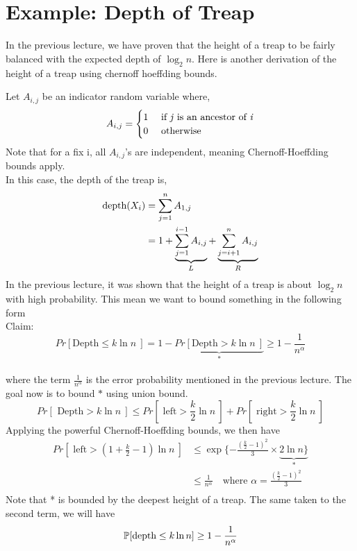 \documentclass[12pt]{article}
\begin{document}
	\MakeScribeTop


\section{Example: Depth of Treap}

 \parindent In the previous lecture, we have proven that the height of a treap to be fairly balanced with the expected depth of $\log_{2}{n}$. Here is another derivation of the height of a treap using chernoff hoeffding bounds. 
 
\setlength{\parindent}{1cm} Let $A_{i,j}$ be an indicator random variable where, $$A_{i,j} = \begin{cases}
                   1 &\text{ if \textit{j} is an ancestor of \textit{i}} \\
                   0 &\text{ otherwise}
               \end{cases}
      $$
Note that for a fix i, all $A_{i,j}$'s are independent, meaning Chernoff-Hoeffding bounds apply.\\
In this case, the depth of the treap is,
\newline \begin{align*}
    \textmd{depth}(X_{i})  &= \sum_{j=1}^{n} A_{1,j}\\
                  &= 1 + \underbrace{\sum_{j=1}^{i-1}A_{i,j}}_{L} +\underbrace{\sum_{j=i+1}^{n}A_{i,j}}_{R}\\
\end{align*}
In the previous lecture, it was shown that the height of a treap is about $\log_{2}{n}$ with high probability. This mean we want to bound something in the following form\\
Claim: $$Pr[\text{Depth} \leq  k\ln{n} \ ] = 1-\underbrace{Pr[ \text{Depth} >  k\ln{n} \ ]}_{*}\geq 1- \frac{1}{n^{\alpha}}$$\\
where the term  $\frac{1}{n^{\alpha}}$ is the error probability mentioned in the previous lecture. 
The goal now is to bound $*$ using union bound.
$$Pr[ \text{ Depth} >  k\ln{n} \ ] \leq Pr[ \text{ left} >  \frac{k}{2}\ln{n} \ ] + Pr[ \text{ right} >  \frac{k}{2}\ln{n} \ ]$$
Applying the powerful Chernoff-Hoeffding bounds, we then have
\begin{align*}
   Pr[ \text{ left} >  (1 + \frac{k}{2}-1)\ln{n} \ ] &\leq \exp\{-\frac{(\frac{k}{2}-1)^2}{3} \times \underbrace{2\ln{n}\}}_{*}\\
   &\leq \frac{1}{n^\alpha} \quad \text{where } \alpha = \frac{(\frac{k}{2}-1)^2}{3}\\
\end{align*}
Note that * is bounded by the deepest height of a treap. The same taken to the second term, we will have
$$ \mathbb{P}[\textmd{depth} \leq k\ln{n} ] \geq 1-\frac{1}{n^\alpha} $$
\end{document}
